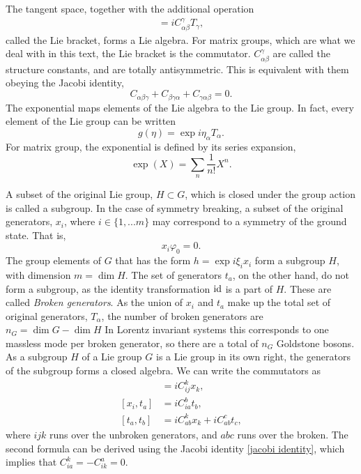 The tangent space, together with the additional operation
\begin{align}
    [T_\alpha, T_\beta] = iC_{\alpha\beta}^\gamma T_\gamma,
\end{align}
called the Lie bracket, forms a Lie algebra.
For matrix groups, which are what we deal with in this text, the Lie bracket is the commutator.
$C_{\alpha \beta}^\gamma$ are called the structure constants, and are totally antisymmetric.
This is equivalent with them obeying the Jacobi identity,
\begin{equation}
    \label{jacobi identity}
    C_{\alpha \beta\gamma} + C_{\beta\gamma\alpha} +  C_{\gamma\alpha\beta} = 0.
\end{equation}
The exponential maps elements of the Lie algebra to the Lie group.
In fact, every element of the Lie group can be written
\begin{equation}
    g(\eta) = \exp{i \eta_\alpha T_\alpha}.
\end{equation}
For matrix group, the exponential is defined by its series expansion,
\begin{equation}
    \exp(X) = \sum_n \frac{1}{n!} X^n.
\end{equation}

A subset of the original Lie group, $H \subset G$, which is closed under the group action is called a subgroup.
In the case of symmetry breaking, a subset of the original generators, $x_i$, where $i \in \{1,... m\}$ may correspond to a symmetry of the ground state.
That is,
\begin{equation}
    x_i \varphi_0 = 0.
\end{equation}
The group elements of $G$ that has the form $h = \exp{i \xi_i x_i}$ form a subgroup $H$, with dimension $m = \dim H$.
The set of generators $t_a$, on the other hand, do not form a subgroup, as the identity transformation $\mathrm{id}$ is a part of $H$.
These are called \emph{Broken generators}.
As the union of $x_i$ and $t_a$ make up the total set of original generators, $T_\alpha$, the number of broken generators are $n_G = \dim G - \dim H$
In Lorentz invariant systems this corresponds to one massless mode per broken generator, so there are a total of $n_G$ Goldstone bosons.
As a subgroup $H$ of a Lie group $G$ is a Lie group in its own right, the generators of the subgroup forms a closed algebra.
We can write the commutators as 
\begin{align}
    [x_i, x_j] &= i C_{i j}^{k} x_k,\\
    [x_i, t_a] &= i C_{i a}^b t_b, \\
    [t_a, t_b] &= i C_{ab}^k x_k + i C_{ab}^c t_c,
\end{align}
where $ijk$ runs over the unbroken generators, and $abc$ runs over the broken.
The second formula can be derived using the Jacobi identity \cref{jacobi identity}, which implies that $C_{ia}^k = -C_{ik}^a = 0$.


